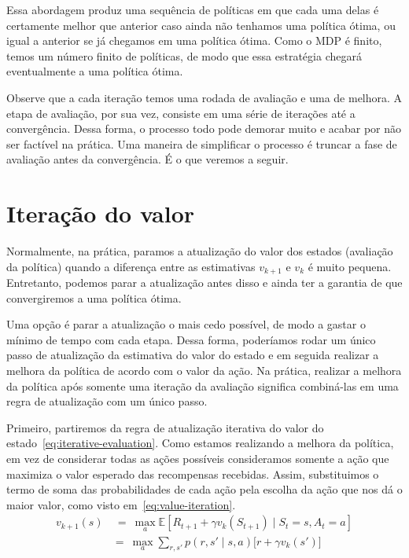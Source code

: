 \documentclass{article}
\begin{document}
        Essa abordagem produz uma sequência de políticas em que cada uma delas é certamente melhor que anterior caso ainda não tenhamos uma política ótima, ou igual a anterior se já chegamos em uma política ótima. Como o MDP é finito, temos um número finito de políticas, de modo que essa estratégia chegará eventualmente a uma política ótima.
        
        Observe que a cada iteração temos uma rodada de avaliação e uma de melhora. A etapa de avaliação, por sua vez, consiste em uma série de iterações até a convergência. Dessa forma, o processo todo pode demorar muito e acabar por não ser factível na prática. Uma maneira de simplificar o processo é truncar a fase de avaliação antes da convergência. É o que veremos a seguir.

    \section{Iteração do valor}

        Normalmente, na prática, paramos a atualização do valor dos estados (avaliação da política) quando a diferença entre as estimativas $v_{k+1}$ e $v_k$ é muito pequena. Entretanto, podemos parar a atualização antes disso e ainda ter a garantia de que convergiremos a uma política ótima.

        Uma opção é parar a atualização o mais cedo possível, de modo a gastar o mínimo de tempo com cada etapa. Dessa forma, poderíamos rodar um único passo de atualização da estimativa do valor do estado e em seguida realizar a melhora da política de acordo com o valor da ação. Na prática, realizar a melhora da política após somente uma iteração da avaliação significa combiná-las em uma regra de atualização com um único passo.

        Primeiro, partiremos da regra de atualização iterativa do valor do estado~\eqref{eq:iterative-evaluation}. Como estamos realizando a melhora da política, em vez de considerar todas as ações possíveis consideramos somente a ação que maximiza o valor esperado das recompensas recebidas. Assim, substituimos o termo de soma das probabilidades de cada ação pela escolha da ação que nos dá o maior valor, como visto em~\eqref{eq:value-iteration}.
        \begin{equation}
            \begin{aligned}
                v_{k+1}(s) & \ = \ \max_a \mathbb{E}[R_{t+1} + \gamma v_k(S_{t+1}) \mid S_t = s, A_t = a] \\
                & = \ \max_a \sum_{r, s'} p(r, s' \mid s, a) \Big[ r + \gamma v_k(s') \Big]
            \end{aligned}
            \label{eq:value-iteration}
        \end{equation}
    
\end{document}
